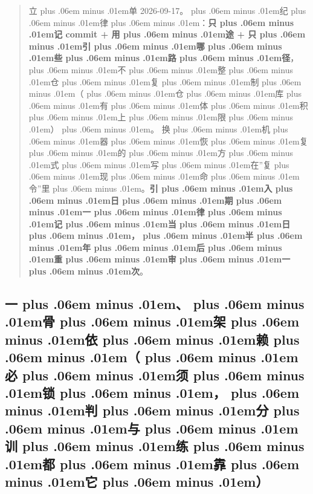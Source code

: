 \documentclass[
]{article}
\def\zh#1{{\zhfont #1}}
\def\zhglue{\hskip0pt plus .06em minus .01em}
\begin{document}
\begin{quote}
\zh{立\zhglue 单} 2026-09-17\zh{。\zhglue 纪\zhglue 律\zhglue ：}\textbf{\zh{只\zhglue 记} commit + \zh{用\zhglue 途} + \zh{只\zhglue 引\zhglue 哪\zhglue 些\zhglue 路\zhglue 径}}\zh{，\zhglue 不\zhglue 整\zhglue 仓\zhglue 复\zhglue 制\zhglue （\zhglue 仓\zhglue 库\zhglue 有\zhglue 体\zhglue 积\zhglue 上\zhglue 限\zhglue ）\zhglue 。} \zh{换\zhglue 机\zhglue 器\zhglue 恢\zhglue 复\zhglue 的\zhglue 方\zhglue 式\zhglue 写\zhglue 在}''\zh{复\zhglue 现\zhglue 命\zhglue 令}''\zh{里\zhglue 。}\textbf{\zh{引\zhglue 入\zhglue 日\zhglue 期\zhglue 一\zhglue 律\zhglue 记\zhglue 当\zhglue 日\zhglue ，\zhglue 半\zhglue 年\zhglue 后\zhglue 重\zhglue 审\zhglue 一\zhglue 次}}\zh{。}
\end{quote}

\subsection{\zh{一\zhglue 、\zhglue 骨\zhglue 架\zhglue 依\zhglue 赖\zhglue （\zhglue 必\zhglue 须\zhglue 锁\zhglue ，\zhglue 判\zhglue 分\zhglue 与\zhglue 训\zhglue 练\zhglue 都\zhglue 靠\zhglue 它\zhglue ）}}\label{ux4e00ux9aa8ux67b6ux4f9dux8d56ux5fc5ux987bux9501ux5224ux5206ux4e0eux8badux7ec3ux90fdux9760ux5b83}
\end{document}
